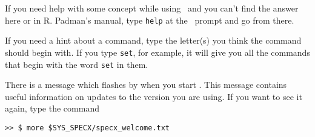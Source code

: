 If you need help with some concept while using \SPECX\ and you can't
find the answer here or in R. Padman's manual, type {\tt help} at the
\SP\ prompt and go from there.

If you need a hint about a command, type the letter(s) you think the
command should begin with.  If you type {\tt set}, for example, it
will give you all the commands that begin with the word {\tt set} in
them.

There is a message which flashes by when you start \SPECX . This message 
contains useful information on updates to the version you are using.
If you want to see it again, type the command

\verb|>> $ more $SYS_SPECX/specx_welcome.txt|

\typeout{  }
\typeout{*****************************************************}
\typeout{  }
\typeout{  }
\typeout{*****************************************************}
\typeout{  }


